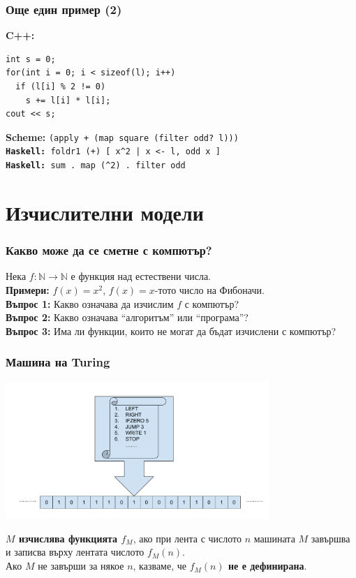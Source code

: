 \documentclass[alsotrans]{beamerswitch}
\begin{document}
\begin{frame}[fragile]
  \frametitle{Още един пример (2)}
  \textbf{C++:}
\begin{verbatim}
int s = 0;
for(int i = 0; i < sizeof(l); i++)
  if (l[i] % 2 != 0)
    s += l[i] * l[i];
cout << s;
\end{verbatim}
  \pause
  \textbf{Scheme:} \tt{(apply + (map square (filter odd? l)))}\\[2ex]
  \pause
  \textbf{Haskell:} \tt{foldr1 (+) [ x\^{}2 | x <- l, odd x ]}\\[2ex]
  \pause
  \textbf{Haskell:} \tt{sum . map (\^{}2) . filter odd}
\end{frame}

\section*{Изчислителни модели}

\begin{frame}
  \frametitle{Какво може да се сметне с компютър?}

  Нека $f:\mathbb N\to\mathbb N$ е функция над естествени числа.\\[2ex]

  \textbf{Примери:} $f(x) = x^2$, $f(x) = x$-тото число на Фибоначи.\\[4ex]
  \pause
  \textbf{Въпрос 1:} Какво означава да изчислим $f$ с компютър?\\[4ex]
  \pause
  \textbf{Въпрос 2:} Какво означава ``алгоритъм'' или ``програма''?\\[4ex]
  \pause
  \textbf{Въпрос 3:} Има ли функции, които не могат да бъдат изчислени с компютър?
\end{frame}

\begin{frame}
  \frametitle{Машина на Turing}

  \vspace*{-4ex}
  \begin{center}
    \includegraphics[width=0.75\textwidth]{images/turing.pdf}
  \end{center}
  \pause
  \vspace*{-1ex}
  \textbf{$M$ изчислява функцията $f_M$}, ако при лента с числото $n$ машината $M$ завършва и записва върху лентата числото $f_M(n)$.\\
  \pause
  Ако $M$ не завърши за някое $n$, казваме, че \textbf{$f_M(n)$ не е дефинирана}.
\end{frame}
\end{document}
